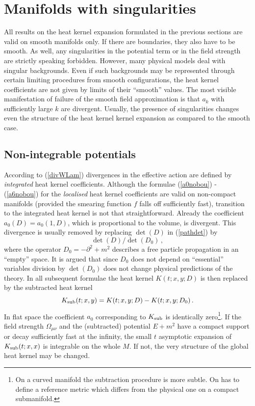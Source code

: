 \section{Manifolds with singularities}\label{sec6}
All results on the heat kernel expansion formulated in the
previous sections are valid on
smooth manifolds only. If there are boundaries, they also
have to be smooth. As well, any singularities in the potential
term or in the field strength are strictly speaking forbidden.
However, many physical models deal with singular backgrounds.
Even if such backgrounds may be represented through certain limiting
procedures from smooth configurations, the heat kernel coefficients
are not given by limits of their ``smooth'' values. The most visible
manifestation of failure of the smooth field approximation is that $a_k$
with sufficiently large $k$ are divergent. Usually, the presence of
singularities changes even the structure of the heat kernel
kernel expansion as compared to the smooth case. 

\subsection{Non-integrable potentials}\label{s6sinpot}
According to (\ref{divWLam}) divergences in the effective action
are defined by {\it integrated} heat kernel coefficients.
Although the formulae (\ref{a0nobou}) - (\ref{a6nobou}) for 
the {\it localised} heat kernel coefficients are valid on
non-compact manifolds (provided the smearing function $f$
falls off sufficiently fast), transition to the integrated
heat kernel is not that straightforward. Already the coefficient
$a_0(D)=a_0(1,D)$, which is proportional to the volume,
is divergent. This divergence is usually removed by replacing
$\det (D)$ in (\ref{pathdet}) by
\begin{equation}
\det (D)/\det (D_0) \,,\label{referdet}
\end{equation}
where the operator $D_0=-\partial^2+m^2$ describes a free particle
propagation in an ``empty'' space. It is argued that since $D_0$ does
not depend on ``essential'' variables division by $\det (D_0)$ does not
change physical predictions of the theory. In all subsequent formulae
the heat kernel $K(t;x,y;D)$ is then replaced by the subtracted
heat kernel
\begin{equation}
K_{\rm sub} (t;x,y)=K(t;x,y;D)-K(t;x,y;D_0) \,.
\label{Ksub}
\end{equation}
In flat space the coefficient $a_0$ corresponding to $K_{\rm sub}$
is identically zero\footnote{On a curved manifold the subtraction
procedure is more subtle. On has to define a reference metric which
differs from the physical one on a compact submanifold.}. If the field
strength $\Omega_{\mu\nu}$ and the (subtracted) potential $E+m^2$ 
have a compact support or decay sufficiently fast at the infinity,
the small $t$ asymptotic expansion of $K_{\rm sub}(t;x,x)$ is
integrable on the whole $M$. If not, the very structure of the
global heat kernel may be changed.

